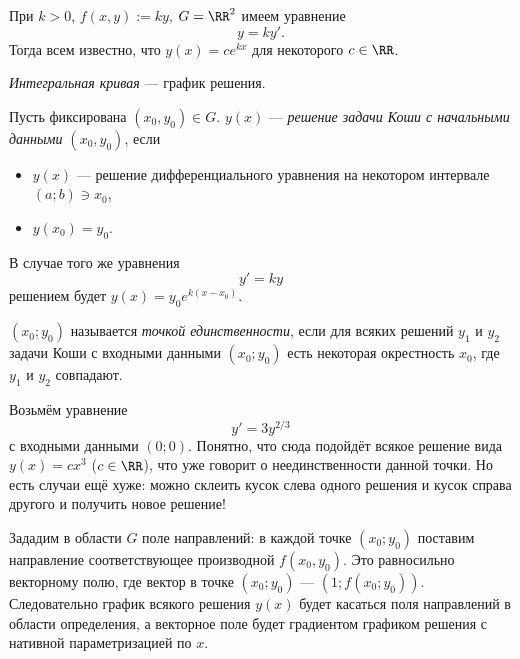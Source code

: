 \documentclass[12pt,a4paper]{article}
\begin{document}
    \begin{example}
        При $k > 0$, $f(x, y) := ky$, $G = \RR^2$ имеем уравнение
        \[y = ky'.\]
        Тогда всем известно, что $y(x) = c e^{kx}$ для некоторого $c \in \RR$.
    \end{example}

    \begin{definition}
        \emph{Интегральная кривая} --- график решения.
    \end{definition}

    \begin{definition}
        Пусть фиксирована $(x_0, y_0) \in G$. $y(x)$ --- \emph{решение задачи Коши с начальными данными $(x_0, y_0)$}, если
        \begin{itemize}
            \item $y(x)$ --- решение дифференциального уравнения на некотором интервале $(a; b) \ni x_0$,
            \item $y(x_0) = y_0$.
        \end{itemize}
    \end{definition}

    \begin{example}
        В случае того же уравнения
        \[y' = ky\]
        решением будет $y(x) = y_0 e^{k(x - x_0)}$.
    \end{example}

    \begin{definition}
        $(x_0; y_0)$ называется \emph{точкой единственности}, если для всяких решений $y_1$ и $y_2$ задачи Коши с входными данными $(x_0; y_0)$ есть некоторая окрестность $x_0$, где $y_1$ и $y_2$ совпадают.
    \end{definition}

    \begin{example}
        Возьмём уравнение
        \[y' = 3 y^{2/3}\]
        с входными данными $(0; 0)$. Понятно, что сюда подойдёт всякое решение вида $y(x) = cx^3$ ($c \in \RR$), что уже говорит о неединственности данной точки. Но есть случаи ещё хуже: можно склеить кусок слева одного решения и кусок справа другого и получить новое решение!
    \end{example}

    \begin{definition}
        Зададим в области $G$ поле направлений: в каждой точке $(x_0; y_0)$ поставим направление соответствующее производной $f(x_0, y_0)$. Это равносильно векторному полю, где вектор в точке $(x_0; y_0)$ --- $(1; f(x_0; y_0))$. Следовательно график всякого решения $y(x)$ будет касаться поля направлений в области определения, а векторное поле будет градиентом графиком решения с нативной параметризацией по $x$.
    \end{definition}
\end{document}
